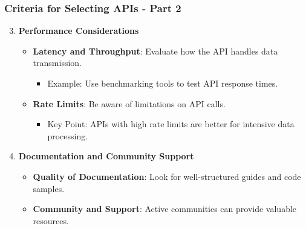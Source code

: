 \documentclass[aspectratio=169]{beamer}
\begin{document}
\begin{frame}[fragile]
    \frametitle{Criteria for Selecting APIs - Part 2}
    \begin{enumerate}
        \setcounter{enumi}{2} %
        \item \textbf{Performance Considerations}
        \begin{itemize}
            \item \textbf{Latency and Throughput}: Evaluate how the API handles data transmission.
            \begin{itemize}
                \item Example: Use benchmarking tools to test API response times.
            \end{itemize}
            \item \textbf{Rate Limits}: Be aware of limitations on API calls.
            \begin{itemize}
                \item Key Point: APIs with high rate limits are better for intensive data processing.
            \end{itemize}
        \end{itemize}
        
        \item \textbf{Documentation and Community Support}
        \begin{itemize}
            \item \textbf{Quality of Documentation}: Look for well-structured guides and code samples.
            \item \textbf{Community and Support}: Active communities can provide valuable resources.
        \end{itemize}
    \end{enumerate}
\end{frame}
\end{document}
